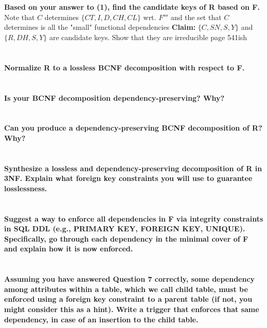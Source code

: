 \documentclass{article}
\theoremstyle{remark}
\numberwithin{equation}{section}
\begin{document}
	\section{}
	\textbf{Based on your answer to (1), find the candidate keys of R based on F.}
	Note that $C$ determines $\{CT,I,D,CH,CL\}$ wrt. $F'''$ and the set that $C$ determines is all the "small" functional dependencies
	\textbf{Claim:} $\{ C,SN,S,Y\}$ and $\{ R, DH, S, Y \}$ are candidate keys.
	Show that they are irreducible page 541ish
	\section{}
	\textbf{Normalize R to a lossless BCNF decomposition with respect to F.}
	\section{}
	\textbf{Is your BCNF decomposition dependency-preserving? Why?}
	\section{}
	\textbf{Can you produce a dependency-preserving BCNF decomposition of R? Why?}
	\section{}
	\textbf{Synthesize a lossless and dependency-preserving decomposition of R in 3NF.
		Explain what foreign key constraints you will use to guarantee losslessness.}
	\section{}
	\textbf{Suggest a way to enforce all dependencies in F via integrity constraints in SQL DDL
		(e.g., PRIMARY KEY, FOREIGN KEY, UNIQUE). Specifically, go through each
		dependency in the minimal cover of F and explain how it is now enforced.}
	\section{}
	\textbf{Assuming you have answered Question 7 correctly, some dependency among
		attributes within a table, which we call child table, must be enforced using a foreign
		key constraint to a parent table (if not, you might consider this as a hint). Write a
		trigger that enforces that same dependency, in case of an insertion to the child table.}
	
\end{document}
